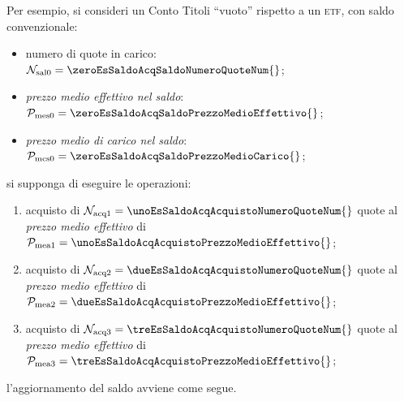 \documentclass[12pt,a4paper]{article}
\newcommand{\Virgolette}[1]{``#1''}
\newcommand{\Etf}[1]{\textsc{etf}}
\newcommand{\Nacq}[1]{\mathcal{N}_{\textrm{acq}#1}}
\newcommand{\Nsal}[1]{\mathcal{N}_{\textrm{sal}#1}}
\newcommand{\Pme}[1]{\mathcal{P}_{\mathrm{me}#1}}
\newcommand{\Pmea}[1]{\mathcal{P}_{\mathrm{mea}#1}}
\newcommand{\Pmes}[1]{\Pme{\mathrm{s}#1}}
\newcommand{\Pmc}[1]{\mathcal{P}_{\mathrm{mc}#1}}
\newcommand{\Pmcs}[1]{\Pmc{\mathrm{s}#1}}
\begin{document}
Per  esempio, si  consideri un  Conto  Titoli \Virgolette{vuoto}  rispetto  a un  \Etf{}, con  saldo
convenzionale:
\begin{itemize}
\item numero di quote in carico: \(\Nsal{0} = \zeroEsSaldoAcqSaldoNumeroQuoteNum{}\);
\item \emph{prezzo medio effettivo nel saldo}:
  \(\Pmes{0} = \zeroEsSaldoAcqSaldoPrezzoMedioEffettivo{}\);
\item \emph{prezzo medio di carico nel saldo}:
  \(\Pmcs{0} = \zeroEsSaldoAcqSaldoPrezzoMedioCarico{}\);
\end{itemize}
si supponga di eseguire le operazioni:
\begin{enumerate}
\item acquisto di \(\Nacq{1} = \unoEsSaldoAcqAcquistoNumeroQuoteNum{}\) quote al \emph{prezzo medio
     effettivo} di \(\Pmea{1} = \unoEsSaldoAcqAcquistoPrezzoMedioEffettivo{}\);
\item acquisto di \(\Nacq{2} = \dueEsSaldoAcqAcquistoNumeroQuoteNum{}\) quote al \emph{prezzo medio
     effettivo} di \(\Pmea{2} = \dueEsSaldoAcqAcquistoPrezzoMedioEffettivo{}\);
\item acquisto di \(\Nacq{3} = \treEsSaldoAcqAcquistoNumeroQuoteNum{}\) quote al \emph{prezzo medio
     effettivo} di \(\Pmea{3} = \treEsSaldoAcqAcquistoPrezzoMedioEffettivo{}\);
\end{enumerate}
l'aggiornamento del saldo avviene come segue.


\end{document}
